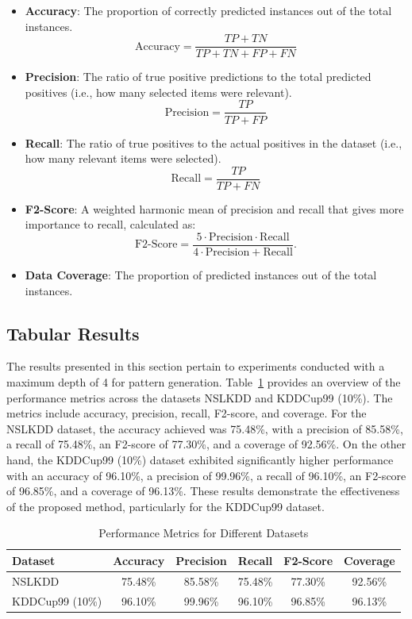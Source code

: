 \documentclass[pdflatex,sn-mathphys-num]{sn-jnl}%
\let\oldcaption\caption
\renewcommand{\caption}[1]{\oldcaption{\centering #1}}
\theoremstyle{thmstyleone}%
\theoremstyle{thmstyletwo}%
\theoremstyle{thmstylethree}%
\begin{document}
\begin{itemize} 
    \item \textbf{Accuracy}: The proportion of correctly predicted instances out of the total instances.
    \[
    \text{Accuracy} = \frac{TP + TN}{TP + TN + FP + FN}
    \]
    \item \textbf{Precision}: The ratio of true positive predictions to the total predicted positives (i.e., how many selected items were relevant).
    \[
    \text{Precision} = \frac{TP}{TP+FP}
    \]
    \item \textbf{Recall}: The ratio of true positives to the actual positives in the dataset (i.e., how many relevant items were selected).
    \[
    \text{Recall} = \frac{TP}{TP+FN}
    \]
    \item \textbf{F2-Score}: A weighted harmonic mean of precision and recall that gives more importance to recall, calculated as:
    \[
    \text{F2-Score} = \frac{5 \cdot \text{Precision} \cdot \text{Recall}}{4 \cdot \text{Precision} + \text{Recall}}.
    \]
    \item \textbf{Data Coverage}: The proportion of predicted instances out of the total instances.
\end{itemize}

\subsection{Tabular Results}
The results presented in this section pertain to experiments conducted with a maximum depth of 4 for pattern generation.
Table~\ref{tab:4result} provides an overview of the performance metrics across the datasets NSLKDD and KDDCup99 (10\%).
The metrics include accuracy, precision, recall, F2-score, and coverage.
For the NSLKDD dataset, the accuracy achieved was 75.48\%, with a precision of 85.58\%, a recall of 75.48\%, an F2-score of 77.30\%, and a coverage of 92.56\%.
On the other hand, the KDDCup99 (10\%) dataset exhibited significantly higher performance with an accuracy of 96.10\%, a precision of 99.96\%, a recall of 96.10\%, an F2-score of 96.85\%, and a coverage of 96.13\%.
These results demonstrate the effectiveness of the proposed method, particularly for the KDDCup99 dataset.

\begin{table}[ht!]
    \centering
    \caption{Performance Metrics for Different Datasets}
    \begin{tabular}{lccccc}
    \toprule
    \textbf{Dataset} & \textbf{Accuracy} & \textbf{Precision} & \textbf{Recall} & \textbf{F2-Score} & \textbf{Coverage} \\
    \midrule
    NSLKDD & 75.48\% & 85.58\% & 75.48\% & 77.30\% & 92.56\% \\
    KDDCup99 (10\%) & 96.10\% & 99.96\% & 96.10\% & 96.85\% & 96.13\% \\
    \bottomrule
    \end{tabular}
    \label{tab:4result}
\end{table}
\end{document}
